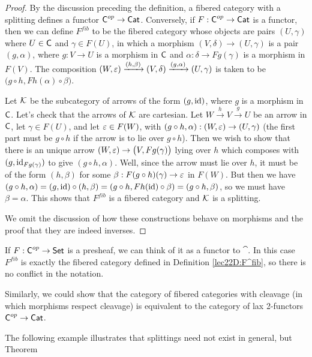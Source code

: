  \begin{proof}
   By the discussion preceding the definition, a fibered category with a splitting
   defines a functor $\text{\sf C}^{op}\to \text{\sf Cat}$. Conversely, if $F:\text{\sf C}^{op}\to \text{\sf Cat}$ is a functor,
   then we can define $F^{fib}$ to be the fibered category whose objects are pairs
   $(U,\gamma)$ where $U\in \text{\sf C}$ and $\gamma\in F(U)$, in which a morphism $(V,\delta)\to
   (U,\gamma)$ is a pair $(g,\alpha)$, where $g:V\to U$ is a morphism in $\text{\sf C}$ and
   $\alpha:\delta\to Fg(\gamma)$ is a morphism in $F(V)$. The composition
   $(W,\varepsilon)\xrightarrow{(h,\beta)}(V,\delta)\xrightarrow{(g,\alpha)}(U,\gamma)$ is taken
   to be $\bigl(g\circ h,Fh(\alpha)\circ \beta\bigr)$.

   Let $\mathcal{K}$ be the subcategory of arrows of the form $(g,\operatorname{id})$, where $g$ is a morphism
   in $\text{\sf C}$. Let's check that the arrows of $\mathcal{K}$ are cartesian. Let $W\xrightarrow h
   V\xrightarrow g U$ be an arrow in $\text{\sf C}$, let $\gamma\in F(U)$, and let $\varepsilon\in F(W)$,
   with $(g\circ h,\alpha):(W,\varepsilon)\to (U,\gamma)$ (the first part must be $g\circ h$ if
   the arrow is to lie over $g\circ h$). Then we wish to show that there is an unique
   arrow $(W,\varepsilon)\to \bigl(V,Fg(\gamma)\bigr)$ lying over $h$ which composes with
   $(g,\operatorname{id}_{Fg(\gamma)})$ to give $(g\circ h,\alpha)$. Well, since the arrow must lie
   over $h$, it must be of the form $(h,\beta)$ for some $\beta:F(g\circ h)(\gamma)\to
   \varepsilon$ in $F(W)$. But then we have $(g\circ h,\alpha)=(g,\operatorname{id})\circ (h,\beta)=(g\circ
   h,Fh(\operatorname{id})\circ \beta)=(g\circ h,\beta)$, so we must have $\beta=\alpha$. This shows
   that $F^{fib}$ is a fibered category and $\mathcal{K}$ is a splitting.

   We omit the discussion of how these constructions behave on morphisms and the proof
   that they are indeed inverses.
 \end{proof}
 \begin{remark}
   If $F:\text{\sf C}^{op}\to \text{\sf Set}$ is a presheaf, we can think of it as a functor to $\cat$. In
   this case $F^{fib}$ is exactly the fibered category defined in Definition
   \ref{lec22D:F^fib}, so there is no conflict in the notation.
 \end{remark}
 \begin{remark}
   Similarly, we could show that the category of fibered categories with cleavage (in
   which morphisms respect cleavage) is equivalent to the category of lax 2-functors
   $\text{\sf C}^{op}\to \text{\sf Cat}$.
 \end{remark}
 The following example illustrates that splittings need not exist in general, but Theorem
